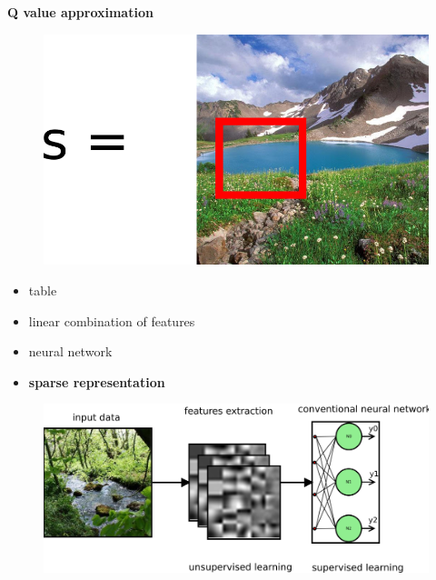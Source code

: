 \documentclass[xcolor=dvipsnames]{beamer}
\begin{document}
\begin{frame}{\bf Q value approximation}

\begin{figure}[htbp]
  \centering
    \includegraphics[scale=0.15]{../pictures/state_space.png}
\end{figure}

\begin{itemize}
  \item table
  \item linear combination of features
  \item neural network
  \item \bf{sparse representation}
\end{itemize}

\begin{figure}[htbp]
  \centering
    \includegraphics[scale=0.27]{../diagrams/features_nn.png}
\end{figure}


\end{frame}
\end{document}

